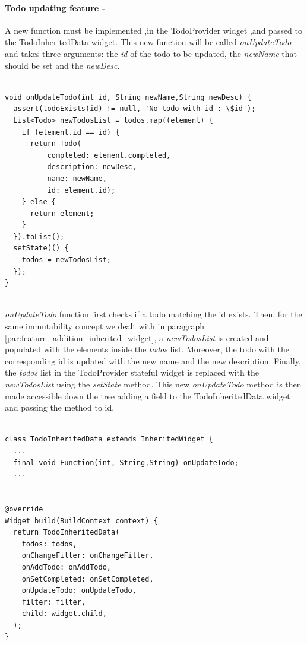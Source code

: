 \paragraph{Todo updating feature - } 
\label{subpar:todo_updating_feature_inherited_wdiget}
A new function must be implemented ,in the TodoProvider widget ,and passed to the TodoInheritedData widget. This new function will be called \textit{onUpdateTodo } and takes three arguments: the \textit{id} of the todo to be updated, the \textit{newName } that should be set and the \textit{newDesc}.
\mbox{}\\
\begin{code}
\mbox{}
\label{code:2.37} 
\begin{verbatim}

void onUpdateTodo(int id, String newName,String newDesc) {
  assert(todoExists(id) != null, 'No todo with id : \$id');
  List<Todo> newTodosList = todos.map((element) {
    if (element.id == id) {
      return Todo(
          completed: element.completed,
          description: newDesc,
          name: newName,
          id: element.id);
    } else {
      return element;
    }
  }).toList();
  setState(() {
    todos = newTodosList;
  });
}

\end{verbatim}
\end{code}
\mbox{}\\
\textit{onUpdateTodo} function first checks if a todo matching the id exists. Then, for the same immutability concept we dealt with in paragraph \ref{par:feature_addition_inherited_widget}, a \textit{newTodosList }is created and populated with the elements inside the \textit{todos }list. Moreover, the todo with the corresponding id is updated with the new name and the new description. Finally, the \textit{todos }list in the TodoProvider stateful widget is replaced with the \textit{newTodosList }using the \textit{setState} method.
This new \textit{onUpdateTodo} method is then made accessible down the tree adding a field to the TodoInheritedData widget and passing the method to id.
\mbox{}\\
\begin{code}

\mbox{}

\label{code:2.38}
\begin{verbatim}

class TodoInheritedData extends InheritedWidget {
  ...
  final void Function(int, String,String) onUpdateTodo;
  ...


@override
Widget build(BuildContext context) {
  return TodoInheritedData(
    todos: todos,
    onChangeFilter: onChangeFilter,
    onAddTodo: onAddTodo,
    onSetCompleted: onSetCompleted,
    onUpdateTodo: onUpdateTodo,
    filter: filter,
    child: widget.child,
  );
}
\end{verbatim}
\end{code}
